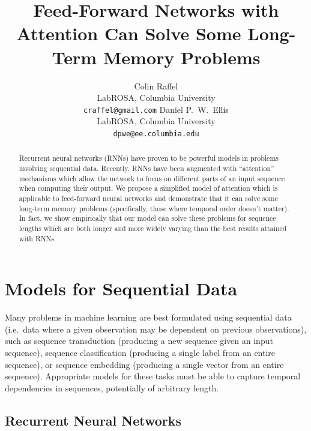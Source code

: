 \documentclass{article} %
\title{Feed-Forward Networks with Attention Can Solve Some Long-Term Memory Problems}
\author{
Colin Raffel\\
LabROSA, Columbia University\\
\texttt{craffel@gmail.com}
\And
Daniel P.~W.~Ellis\\
LabROSA, Columbia University\\
\texttt{dpwe@ee.columbia.edu}
}
\begin{document}
\maketitle

\begin{abstract}
Recurrent neural networks (RNNs) have proven to be powerful models in problems involving sequential data.
Recently, RNNs have been augmented with ``attention'' mechanisms which allow the network to focus on different parts of an input sequence when computing their output.
We propose a simplified model of attention which is applicable to feed-forward neural networks and demonstrate that it can solve some long-term memory problems (specifically, those where temporal order doesn't matter).
In fact, we show empirically that our model can solve these problems for sequence lengths which are both longer and more widely varying than the best results attained with RNNs.
\end{abstract}

\section{Models for Sequential Data}

Many problems in machine learning are best formulated using sequential data (i.e.\ data where a given observation may be dependent on previous observations), such as sequence transduction (producing a new sequence given an input sequence), sequence classification (producing a single label from an entire sequence), or sequence embedding (producing a single vector from an entire sequence).
Appropriate models for these tasks must be able to capture temporal dependencies in sequences, potentially of arbitrary length.

\subsection{Recurrent Neural Networks}
\end{document}
